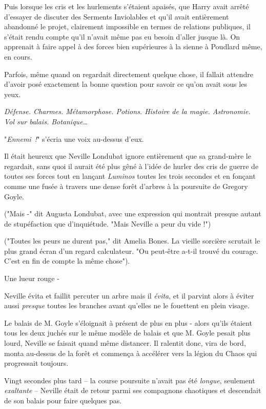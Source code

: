 Puis lorsque les cris et les hurlements s'étaient apaisés, que Harry avait arrêté d'essayer de discuter des Serments Inviolables et qu'il avait entièrement abandonné le projet, clairement impossible en termes de relations publiques, il s'était rendu compte qu'il n'avait même pas eu besoin d'aller jusque là. On apprenait à faire appel à des forces bien supérieures à la sienne à Poudlard même, en cours.

Parfois, même quand on regardait directement quelque chose, il fallait attendre d'avoir posé exactement la bonne question pour savoir ce qu'on avait sous les yeux.

\emph{Défense. Charmes. Métamorphose. Potions. Histoire de la magie. Astronomie. Vol sur balais. Botanique…}

"\emph{Ennemi~!}" s'écria une voix au-dessus d'eux.

\later

Il était heureux que Neville Londubat ignore entièrement que sa grand-mère le regardait, sans quoi il aurait été plus gêné à l'idée de hurler des cris de guerre de toutes ses forces tout en lançant \emph{Luminos} toutes les trois secondes et en fonçant comme une fusée à travers une dense forêt d'arbres à la poursuite de Gregory Goyle.

("Mais -" dit Augusta Londubat, avec une expression qui montrait presque autant de stupéfaction que d'inquiétude. "Mais Neville a peur du vide !")

("Toutes les peurs ne durent pas," dit Amelia Bones. La vieille sorcière scrutait le plus grand écran d'un regard calculateur. "Ou peut-être a-t-il trouvé du courage. C'est en fin de compte la même chose").

Une lueur rouge -

Neville évita et faillit percuter un arbre mais il \emph{évita}, et il parvint alors à éviter aussi \emph{presque} toutes les branches avant qu'elles ne le fouettent en plein visage.

Le balais de M. Goyle s'éloignait à présent de plus en plus - alors qu'ils étaient tous les deux juchés sur le même modèle de balais et que M. Goyle pesait plus lourd, Neville se faisait quand même distancer. Il ralentit donc, vira de bord, monta au-dessus de la forêt et commença à accélérer vers la légion du Chaos qui progressait toujours.

Vingt secondes plus tard -- la course poursuite n'avait pas été \emph{longue}, seulement \emph{exaltante} -- Neville était de retour parmi ses compagnons chaotiques et descendait de son balais pour faire quelques pas.

